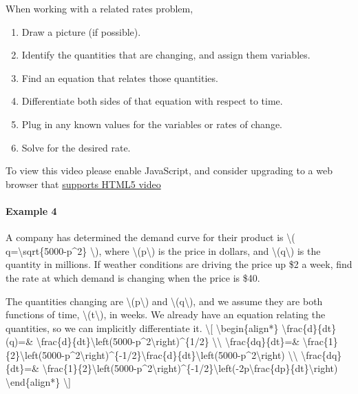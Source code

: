 When working with a related rates problem,

\begin{enumerate}
\tightlist
\item
  Draw a picture (if possible).
\item
  Identify the quantities that are changing, and assign them variables.
\item
  Find an equation that relates those quantities.
\item
  Differentiate both sides of that equation with respect to time.
\item
  Plug in any known values for the variables or rates of change.
\item
  Solve for the desired rate.
\end{enumerate}

To view this video please enable JavaScript, and consider upgrading to a
web browser that \href{http://videojs.com/html5-video-support/}{supports
HTML5 video}

\hypertarget{example-4}{%
\paragraph{Example 4}\label{example-4}}

A company has determined the demand curve for their product is
\textbackslash{}( q=\textbackslash{}sqrt\{5000-p\^{}2\}
\textbackslash{}), where \textbackslash{}(p\textbackslash{}) is the
price in dollars, and \textbackslash{}(q\textbackslash{}) is the
quantity in millions. If weather conditions are driving the price up \$2
a week, find the rate at which demand is changing when the price is
\$40.

The quantities changing are \textbackslash{}(p\textbackslash{}) and
\textbackslash{}(q\textbackslash{}), and we assume they are both
functions of time, \textbackslash{}(t\textbackslash{}), in weeks. We
already have an equation relating the quantities, so we can implicitly
differentiate it. \textbackslash{}{[} \textbackslash{}begin\{align*\}
\textbackslash{}frac\{d\}\{dt\}(q)=\&
\textbackslash{}frac\{d\}\{dt\}\textbackslash{}left(5000-p\^{}2\textbackslash{}right)\^{}\{1/2\}
\textbackslash{}\textbackslash{} \textbackslash{}frac\{dq\}\{dt\}=\&
\textbackslash{}frac\{1\}\{2\}\textbackslash{}left(5000-p\^{}2\textbackslash{}right)\^{}\{-1/2\}\textbackslash{}frac\{d\}\{dt\}\textbackslash{}left(5000-p\^{}2\textbackslash{}right)
\textbackslash{}\textbackslash{} \textbackslash{}frac\{dq\}\{dt\}=\&
\textbackslash{}frac\{1\}\{2\}\textbackslash{}left(5000-p\^{}2\textbackslash{}right)\^{}\{-1/2\}\textbackslash{}left(-2p\textbackslash{}frac\{dp\}\{dt\}\textbackslash{}right)
\textbackslash{}end\{align*\} \textbackslash{}{]}

